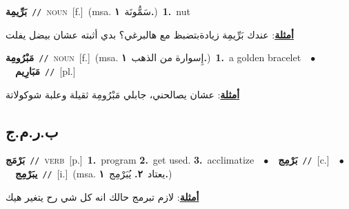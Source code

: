 \documentclass[10pt,a4paper,twoside]{article} %
\begin{document}
\begin{multicols}{2}
{\setlength\topsep{0pt}\textbf{\foreignlanguage{arabic}{بَرِّيمِة}}\ {\color{gray}\texttt{//}\color{black}}\ \textsc{noun}\ [f.]\ \color{gray}(msa. \foreignlanguage{arabic}{سَمُّونَة}~\foreignlanguage{arabic}{\textbf{١.}})\color{black}\ \textbf{1.}~nut\  \begin{flushright}\color{gray}\foreignlanguage{arabic}{\textbf{\underline{\foreignlanguage{arabic}{أمثلة}}}: عندك بَرِّيمِة زيادةبتضبظ مع هالبرغي؟ بدي أثبته عشان بيضل يفلت}\end{flushright}\color{black}} \vspace{2mm}

{\setlength\topsep{0pt}\textbf{\foreignlanguage{arabic}{مَبْرُومِة}}\ {\color{gray}\texttt{//}\color{black}}\ \textsc{noun}\ [f.]\ \color{gray}(msa. \foreignlanguage{arabic}{إِسوارة من الذهب}~\foreignlanguage{arabic}{\textbf{١.}})\color{black}\ \textbf{1.}~a golden bracelet\ \ $\bullet$\ \ \setlength\topsep{0pt}\textbf{\foreignlanguage{arabic}{مَبَارِيم}}\ {\color{gray}\texttt{//}\color{black}}\ [pl.]\  \begin{flushright}\color{gray}\foreignlanguage{arabic}{\textbf{\underline{\foreignlanguage{arabic}{أمثلة}}}: عشان يصالحني، جابلي مَبْرُومِة ثقيلة وعلبة شوكولاتة}\end{flushright}\color{black}} \vspace{2mm}

\vspace{-3mm}
\subsection*{\color{blue}\foreignlanguage{arabic}{ب.ر.م.ج}\color{blue}{}} 

{\setlength\topsep{0pt}\textbf{\foreignlanguage{arabic}{بَرْمَج}}\ {\color{gray}\texttt{//}\color{black}}\ \textsc{verb}\ [p.]\ \textbf{1.}~program  \textbf{2.}~get used.  \textbf{3.}~acclimatize\ \ $\bullet$\ \ \setlength\topsep{0pt}\textbf{\foreignlanguage{arabic}{بَرْمِج}}\ {\color{gray}\texttt{//}\color{black}}\ [c.]\ \ $\bullet$\ \ \setlength\topsep{0pt}\textbf{\foreignlanguage{arabic}{يبَرْمِج}}\ {\color{gray}\texttt{//}\color{black}}\ [i.]\ \color{gray}(msa. \foreignlanguage{arabic}{يعتاد}~\foreignlanguage{arabic}{\textbf{٢.}}  \foreignlanguage{arabic}{يُبَرْمِج}~\foreignlanguage{arabic}{\textbf{١.}})\color{black}\  \begin{flushright}\color{gray}\foreignlanguage{arabic}{\textbf{\underline{\foreignlanguage{arabic}{أمثلة}}}: لازم تبرمج حالك انه كل شي رح يتغير هيك}\end{flushright}\color{black}} \vspace{2mm}


\end{multicols}
\end{document}
